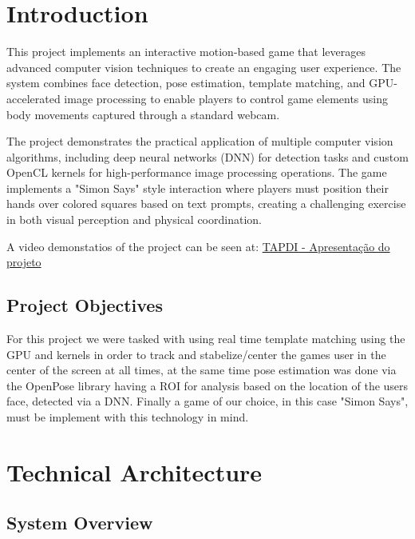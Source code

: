 \documentclass[12pt]{article}
\begin{document}
\tableofcontents
\newpage

\listoffigures
\newpage

\section{Introduction}

This project implements an interactive motion-based game that leverages
advanced computer vision techniques to create an engaging user experience. The
system combines face detection, pose estimation, template matching, and
GPU-accelerated image processing to enable players to control game elements
using body movements captured through a standard webcam.

The project demonstrates the practical application of multiple computer vision
algorithms, including deep neural networks (DNN) for detection tasks and custom
OpenCL kernels for high-performance image processing operations. The game
implements a "Simon Says" style interaction where players must position their
hands over colored squares based on text prompts, creating a challenging
exercise in both visual perception and physical coordination.

A video demonstatios of the project can be seen at:
\href{https://youtu.be/y8x0-IAdg58}{TAPDI - Apresentação do projeto}

\subsection{Project Objectives}

For this project we were tasked with using real time template matching using
the GPU and kernels in order to track and stabelize/center the games user in
the center of the screen at all times, at the same time pose estimation was
done via the OpenPose library having a ROI for analysis based on the location
of the users face, detected via a DNN. Finally a game of our choice, in this
case "Simon Says", must be implement with this technology in mind.

\section{Technical Architecture}

\subsection{System Overview} \label{subsec:System Overview}
\end{document}
